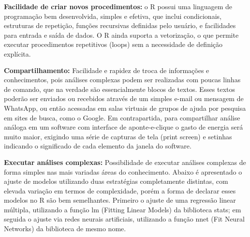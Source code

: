 \documentclass[
  11pt,
  a5paper,
  openany]{book}
\begin{document}
\textbf{Facilidade de criar novos procedimentos:} o R possui uma linguagem de programação bem desenvolvida, simples e efetiva, que inclui condicionais, estruturas de repetição, funções recursivas definidas pelo usuário, e facilidades para entrada e saída de dados. O R ainda suporta a vetorização, o que permite executar procedimentos repetitivos (loops) sem a necessidade de definição explícita.

\textbf{Compartilhamento:} Facilidade e rapidez de troca de informações e conhecimentos, pois análises complexas podem ser realizadas com poucas linhas de comando, que na verdade são essencialmente blocos de textos. Esses textos poderão ser enviados ou recebidos através de um simples e-mail ou mensagem de WhatsApp, ou então acessadas em salas virtuais de grupos de ajuda por pesquisa em sites de busca, como o Google. Em contrapartida, para compartilhar análise análoga em um software com interface de aponte-e-clique o gasto de energia será muito maior, exigindo uma série de capturas de tela (print screen) e setinhas indicando o significado de cada elemento da janela do software.

\textbf{Executar análises complexas:} Possibilidade de executar análises complexas de forma simples nas mais variadas áreas do conhecimento. Abaixo é apresentado o ajuste de modelos utilizando duas estratégias completamente distintas, com elevada variação em termos de complexidade, porém a forma de declarar esses modelos no R são bem semelhantes. Primeiro o ajuste de uma regressão linear múltipla, utilizando a função lm (Fitting Linear Models) da biblioteca stats; em seguida o ajuste via redes neurais artificiais, utilizando a função nnet (Fit Neural Networks) da biblioteca de mesmo nome.
\end{document}
